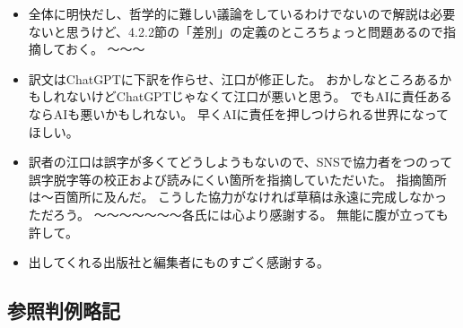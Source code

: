 \documentclass[paper=a4,book,openany]{jlreq} \usepackage{mystyle}
\begin{document}
\begin{itemize}
\item 全体に明快だし、哲学的に難しい議論をしているわけでないので解説は必要ないと思うけど、4.2.2節の「差別」の定義のところちょっと問題あるので指摘しておく。
〜〜〜

\item 訳文はChatGPTに下訳を作らせ、江口が修正した。
おかしなところあるかもしれないけどChatGPTじゃなくて江口が悪いと思う。
でもAIに責任あるならAIも悪いかもしれない。
早くAIに責任を押しつけられる世界になってほしい。
\item 訳者の江口は誤字が多くてどうしようもないので、SNSで協力者をつのって誤字脱字等の校正および読みにくい箇所を指摘していただいた。
指摘箇所は〜百箇所に及んだ。
こうした協力がなければ草稿は永遠に完成しなかっただろう。
〜〜〜〜〜〜〜各氏には心より感謝する。
無能に腹が立っても許して。
\item 出してくれる出版社と編集者にものすごく感謝する。
\end{itemize}
\fi

{\footnotesize
{}
{}

  
}

\subsection*{参照判例略記}
\end{document}
